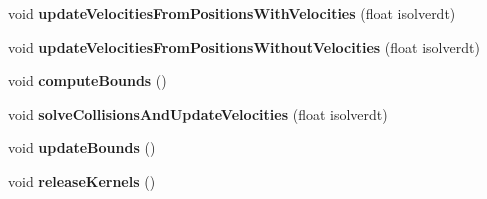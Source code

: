 \begin{DoxyCompactItemize}
\item 
\hypertarget{classbt_d_x11_soft_body_solver_a42608b88bf8addfe8709db7cc8d8af8c}{void {\bfseries update\+Velocities\+From\+Positions\+With\+Velocities} (float isolverdt)}\label{classbt_d_x11_soft_body_solver_a42608b88bf8addfe8709db7cc8d8af8c}

\item 
\hypertarget{classbt_d_x11_soft_body_solver_a5c8e0ffc26b8f0091abd14112fb2b671}{void {\bfseries update\+Velocities\+From\+Positions\+Without\+Velocities} (float isolverdt)}\label{classbt_d_x11_soft_body_solver_a5c8e0ffc26b8f0091abd14112fb2b671}

\item 
\hypertarget{classbt_d_x11_soft_body_solver_a256c52023e8affaac8f309376b92c5e5}{void {\bfseries compute\+Bounds} ()}\label{classbt_d_x11_soft_body_solver_a256c52023e8affaac8f309376b92c5e5}

\item 
\hypertarget{classbt_d_x11_soft_body_solver_ad5e290cbde6331e1efe917ae2d8ebf34}{void {\bfseries solve\+Collisions\+And\+Update\+Velocities} (float isolverdt)}\label{classbt_d_x11_soft_body_solver_ad5e290cbde6331e1efe917ae2d8ebf34}

\item 
\hypertarget{classbt_d_x11_soft_body_solver_a99d25abbd7214746d3f3bf2bb9d0be77}{void {\bfseries update\+Bounds} ()}\label{classbt_d_x11_soft_body_solver_a99d25abbd7214746d3f3bf2bb9d0be77}

\item 
\hypertarget{classbt_d_x11_soft_body_solver_ab48ddcf852021890fad6875a140ecd24}{void {\bfseries release\+Kernels} ()}\label{classbt_d_x11_soft_body_solver_ab48ddcf852021890fad6875a140ecd24}

\end{DoxyCompactItemize}
